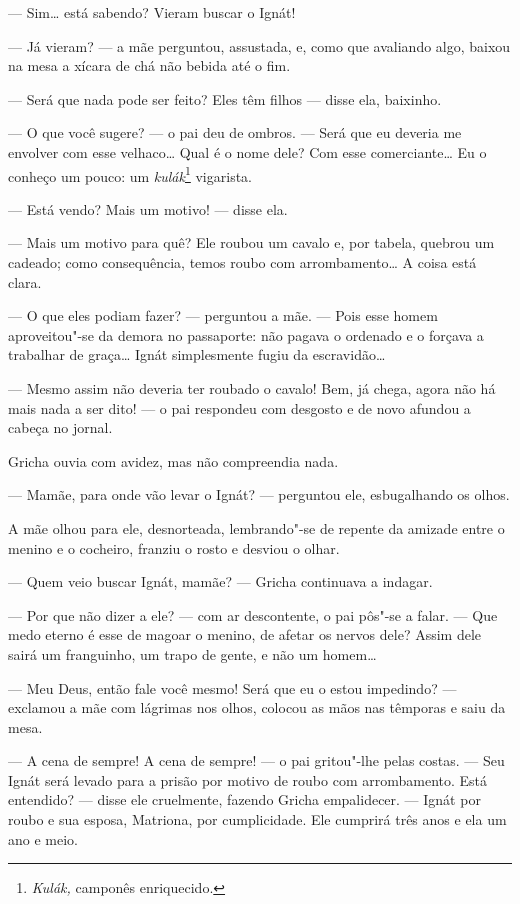 --- Sim\ldots{} está sabendo? Vieram buscar o Ignát!

--- Já vieram? --- a mãe perguntou, assustada, e, como que avaliando
algo, baixou na mesa a xícara de chá não bebida até o fim.

--- Será que nada pode ser feito? Eles têm filhos --- disse ela,
baixinho.

--- O que você sugere? --- o pai deu de ombros. --- Será que eu deveria
me envolver com esse velhaco\ldots{} Qual é o nome dele? Com esse
comerciante\ldots{} Eu o conheço um pouco: um \emph{kulák}\footnote{\emph{Kulák,}
  camponês enriquecido.} vigarista.

--- Está vendo? Mais um motivo! --- disse ela.

--- Mais um motivo para quê? Ele roubou um cavalo e, por tabela, quebrou
um cadeado; como consequência, temos roubo com arrombamento\ldots{} A coisa
está clara.

--- O que eles podiam fazer? --- perguntou a mãe. --- Pois esse homem
aproveitou"-se da demora no passaporte: não pagava o ordenado e o forçava
a trabalhar de graça\ldots{} Ignát simplesmente fugiu da escravidão\ldots{}

--- Mesmo assim não deveria ter roubado o cavalo! Bem, já chega, agora
não há mais nada a ser dito! --- o pai respondeu com desgosto e de novo
afundou a cabeça no jornal.

Gricha ouvia com avidez, mas não compreendia nada.

--- Mamãe, para onde vão levar o Ignát? --- perguntou ele, esbugalhando
os olhos.

A mãe olhou para ele, desnorteada, lembrando"-se de repente da amizade
entre o menino e o cocheiro, franziu o rosto e desviou o olhar.

--- Quem veio buscar Ignát, mamãe? --- Gricha continuava a indagar.

--- Por que não dizer a ele? --- com ar descontente, o pai pôs"-se a
falar. --- Que medo eterno é esse de magoar o menino, de afetar os
nervos dele? Assim dele sairá um franguinho, um trapo de gente, e não um
homem\ldots{}

--- Meu Deus, então fale você mesmo! Será que eu o estou impedindo? ---
exclamou a mãe com lágrimas nos olhos, colocou as mãos nas têmporas e
saiu da mesa.

--- A cena de sempre! A cena de sempre! --- o pai gritou"-lhe pelas
costas. --- Seu Ignát será levado para a prisão por motivo de roubo com
arrombamento. Está entendido? --- disse ele cruelmente, fazendo Gricha
empalidecer. --- Ignát por roubo e sua esposa, Matriona, por
cumplicidade. Ele cumprirá três anos e ela um ano e meio.

